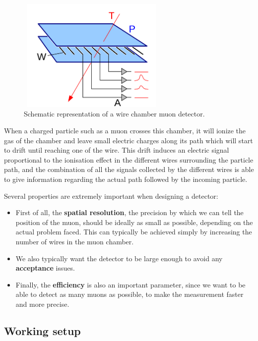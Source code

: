 \documentclass[a4paper, 11pt]{report}
\begin{document}
\begin{figure}[htbp]
\begin{center}
\includegraphics[width=7.2cm, height=5.5cm]{figs/wireChambers.png}
\caption{Schematic representation of a wire chamber muon detector.}
\label{fig:wireChambers}
\end{center}
\end{figure}

When a charged particle such as a muon crosses this chamber, it will ionize the gas of the chamber and leave small electric charges along its path which will start to drift until reaching one of the wire. This drift induces an electric signal proportional to the ionisation effect in the different wires surrounding the particle path, and the combination of all the signals collected by the different wires is able to give information regarding the actual path followed by the incoming particle.	

Several properties are extremely important when designing a detector:
\begin{itemize}
\item First of all, the \textbf{spatial resolution}, the precision by which we can tell the position of the muon, should be ideally as small as possible, depending on the actual problem faced. This can typically be achieved simply by increasing the number of wires in the muon chamber.
\item We also typically want the detector to be large enough to avoid any \textbf{acceptance} issues.
\item Finally, the \textbf{efficiency} is also an important parameter, since we want to be able to detect as many muons as possible, to make the measurement faster and more precise.
\end{itemize}

\subsection{Working setup} \label{sec:ourSetup}
\end{document}

